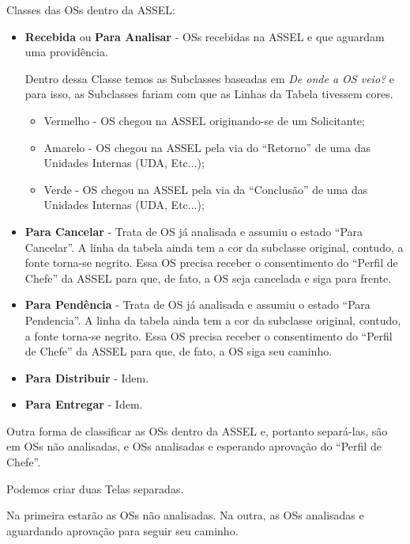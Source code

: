 Classes das OSs dentro da ASSEL:
\begin{itemize}
	\item \textbf{Recebida} ou \textbf{Para Analisar} - OSs recebidas na ASSEL e que aguardam uma providência.
	
	Dentro dessa Classe temos as Subclasses baseadas em \emph{De onde a OS veio?} e para isso, as Subclasses fariam com que as Linhas da Tabela tivessem cores.
	
	\begin{itemize}
		\item Vermelho - OS chegou na ASSEL originando-se de um Solicitante;
		\item Amarelo - OS chegou na ASSEL pela via do ``Retorno'' de uma das Unidades Internas (UDA, Etc...);
		\item Verde - OS chegou na ASSEL pela via da ``Conclusão'' de uma das Unidades Internas (UDA, Etc...);
	\end{itemize} 
	
	
	\item \textbf{Para Cancelar} - Trata de OS já analisada e assumiu o estado ``Para Cancelar''. A linha da tabela ainda tem a cor da subclasse original, contudo, a fonte torna-se negrito. Essa OS precisa receber o consentimento do ``Perfil de Chefe'' da ASSEL para que, de fato, a OS seja cancelada e siga para frente.
	
	\item \textbf{Para Pendência} - Trata de OS já analisada e assumiu o estado ``Para Pendencia''. A linha da tabela ainda tem a cor da subclasse original, contudo, a fonte torna-se negrito. Essa OS precisa receber o consentimento do ``Perfil de Chefe'' da ASSEL para que, de fato, a OS siga seu caminho.
	
	\item \textbf{Para Distribuir} - Idem.
	
	\item \textbf{Para Entregar} - Idem.	
	
	
\end{itemize}


Outra forma de classificar as OSs dentro da ASSEL e, portanto separá-las, são em OSs não analisadas, e OSs analisadas e esperando aprovação do ``Perfil de Chefe''.

Podemos criar duas Telas separadas. 

Na primeira estarão as OSs não analisadas. Na outra, as OSs analisadas e aguardando aprovação para seguir seu caminho.

